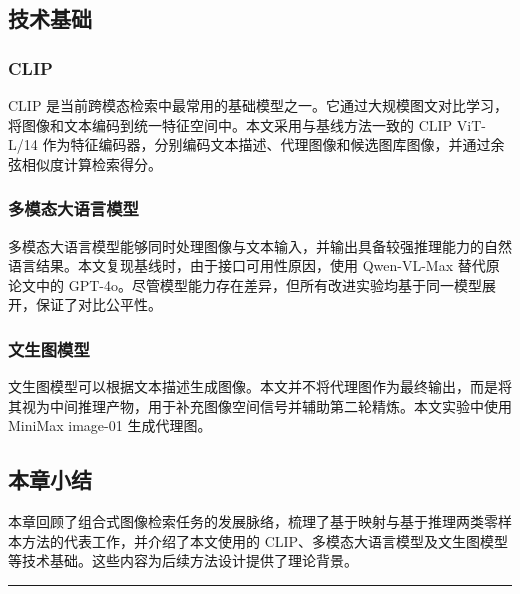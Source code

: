 \documentclass[12pt,a4paper,UTF8,oneside,openany]{ctexrep}
\begin{document}
\hypertarget{ux6280ux672fux57faux7840}{%
\subsection{技术基础}\label{ux6280ux672fux57faux7840}}

\hypertarget{clip}{%
\subsubsection{CLIP}\label{clip}}

CLIP
是当前跨模态检索中最常用的基础模型之一。它通过大规模图文对比学习，将图像和文本编码到统一特征空间中。本文采用与基线方法一致的
CLIP ViT-L/14
作为特征编码器，分别编码文本描述、代理图像和候选图库图像，并通过余弦相似度计算检索得分。

\hypertarget{ux591aux6a21ux6001ux5927ux8bedux8a00ux6a21ux578b}{%
\subsubsection{多模态大语言模型}\label{ux591aux6a21ux6001ux5927ux8bedux8a00ux6a21ux578b}}

多模态大语言模型能够同时处理图像与文本输入，并输出具备较强推理能力的自然语言结果。本文复现基线时，由于接口可用性原因，使用
Qwen-VL-Max 替代原论文中的
GPT-4o。尽管模型能力存在差异，但所有改进实验均基于同一模型展开，保证了对比公平性。

\hypertarget{ux6587ux751fux56feux6a21ux578b}{%
\subsubsection{文生图模型}\label{ux6587ux751fux56feux6a21ux578b}}

文生图模型可以根据文本描述生成图像。本文并不将代理图作为最终输出，而是将其视为中间推理产物，用于补充图像空间信号并辅助第二轮精炼。本文实验中使用
MiniMax image-01 生成代理图。

\hypertarget{ux672cux7ae0ux5c0fux7ed3}{%
\subsection{本章小结}\label{ux672cux7ae0ux5c0fux7ed3}}

本章回顾了组合式图像检索任务的发展脉络，梳理了基于映射与基于推理两类零样本方法的代表工作，并介绍了本文使用的
CLIP、多模态大语言模型及文生图模型等技术基础。这些内容为后续方法设计提供了理论背景。

\begin{center}\rule{0.5\linewidth}{0.5pt}\end{center}
\end{document}
